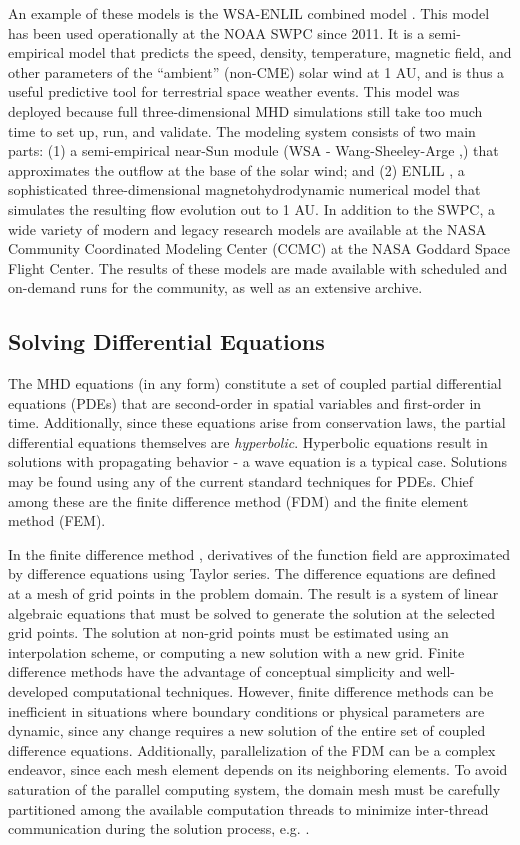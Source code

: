 \documentclass{article}
\begin{document}
An example of these models is the WSA-ENLIL combined model \cite{wsaenlil}. This model has been used operationally at the NOAA SWPC since 2011. It is a semi-empirical model that predicts the speed, density, temperature, magnetic field, and other parameters of the “ambient” (non-CME) solar wind at 1 AU, and is thus a useful predictive tool for terrestrial space weather events. This model was deployed because full three-dimensional MHD simulations still take too much time to set up, run, and validate. The modeling system consists of two main parts: (1)  a semi-empirical near-Sun module (WSA - Wang-Sheeley-Arge \cite{Arge2000},\cite{Sheeley2017}) that approximates the outflow at the base of the solar wind; and (2) ENLIL \cite{enlil}, a sophisticated three-dimensional magnetohydrodynamic numerical model that simulates the resulting flow  evolution out to 1 AU. In addition to the SWPC, a wide variety of modern and legacy research models are available at the NASA Community Coordinated Modeling Center (CCMC) \cite{ccmc} at the NASA Goddard Space Flight Center. The results of these models are made available with scheduled and on-demand runs for the community, as well as an extensive archive.

\subsection{Solving Differential Equations}

The MHD equations (in any form) constitute a set of coupled partial differential equations (PDEs) that are second-order in spatial variables and first-order in time. Additionally, since these equations arise from conservation laws, the partial differential equations themselves are \textit{hyperbolic}. Hyperbolic equations result in solutions with propagating behavior - a wave equation is a typical case. Solutions may be found using any of the current standard techniques for PDEs. Chief among these are the finite difference method (FDM) and the finite element method (FEM).

In the finite difference method \cite{Heath2002}, derivatives of the function field are approximated by difference equations using Taylor series. The difference equations are defined at a mesh of grid points in the problem domain. The result is a system of linear algebraic equations that must be solved to generate the solution at the selected grid points. The solution at non-grid points must be estimated using an interpolation scheme, or computing a new solution with a new grid. Finite difference methods have the advantage of conceptual simplicity and well-developed computational techniques. However, finite difference methods can be inefficient in situations where boundary conditions or physical parameters are dynamic, since any change requires a new solution of the entire set of coupled difference equations. Additionally, parallelization of the FDM can be a complex endeavor, since each mesh element depends on its neighboring elements. To avoid saturation of the parallel computing system, the domain mesh must be carefully partitioned among the available computation threads to minimize inter-thread communication during the solution process, e.g. \cite{Schreiber2017}.
\end{document}
